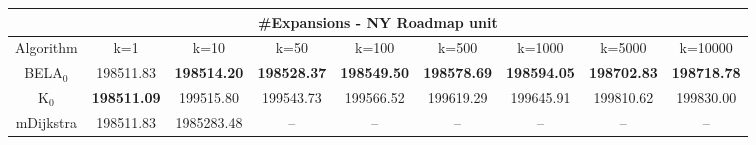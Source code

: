 \begin{tabular}{c|cccccccc}\toprule
\multicolumn{9}{c}{#Expansions - NY Roadmap unit}\\ \midrule
Algorithm & k=1 & k=10 & k=50 & k=100 & k=500 & k=1000 & k=5000 & k=10000 \\ \midrule
BELA$_0$ & 198511.83 & \textbf{198514.20} & \textbf{198528.37} & \textbf{198549.50} & \textbf{198578.69} & \textbf{198594.05} & \textbf{198702.83} & \textbf{198718.78} \\
K$_0$ & \textbf{198511.09} & 199515.80 & 199543.73 & 199566.52 & 199619.29 & 199645.91 & 199810.62 & 199830.00 \\
mDijkstra & 198511.83 & 1985283.48 & -- & -- & -- & -- & -- & -- \\ \bottomrule 
\end{tabular}
